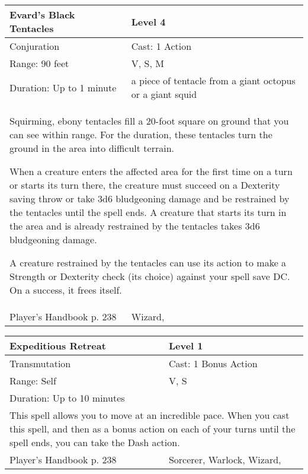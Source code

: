 \documentclass[11pt]{report}
\begin{document}
\begin{table}[H]
	\begin{tabular}{||p{6cm}|p{6cm}||}
		\hline\hline
		\bf{Evard’s Black Tentacles} & Level 4\\ \hline
		Conjuration & Cast: 1 Action\\ \hline
		Range: 90 feet & V, S, M\\ \hline
		Duration: Up to 1 minute & a piece of tentacle from a giant octopus or a giant squid\\ \hline
		\multicolumn{2}{||p{12cm}||}{Squirming, ebony tentacles fill a 20-foot square on ground that you can see within range. For the duration, these tentacles turn the ground in the area into difficult terrain. 

When a creature enters the affected area for the first time on a turn or starts its turn there, the creature must succeed on a Dexterity saving throw or take 3d6 bludgeoning damage and be restrained by the tentacles until the spell ends. A creature that starts its turn in the area and is already restrained by the tentacles takes 3d6 bludgeoning damage. 

A creature restrained by the tentacles can use its action to make a Strength or Dexterity check (its choice) against your spell save DC. On a success, it frees itself.}\\ \hline
Player's Handbook p. 238 & Wizard, \\ \hline\hline
	\end{tabular}
\end{table}

\begin{table}[H]
	\begin{tabular}{||p{6cm}|p{6cm}||}
		\hline\hline
		\bf{Expeditious Retreat} & Level 1\\ \hline
		Transmutation & Cast: 1 Bonus Action\\ \hline
		Range: Self & V, S\\ \hline
		Duration: Up to 10 minutes & \\ \hline
		\multicolumn{2}{||p{12cm}||}{This spell allows you to move at an incredible pace. When you cast this spell, and then as a bonus action on each of your turns until the spell ends, you can take the Dash action.}\\ \hline
Player's Handbook p. 238 & Sorcerer, Warlock, Wizard, \\ \hline\hline
	\end{tabular}
\end{table}
\end{document}
